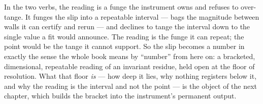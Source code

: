 In the two verbs, the reading is a funge the instrument owns and refuses to over-tange. It funges the slip into a repeatable
interval --- bags the magnitude between walls it can certify and rerun --- and declines to tange the interval down to the
single value a fit would announce. The reading is the funge it can repeat; the point would be the tange it cannot support. So
the slip becomes a number in exactly the sense the whole book means by ``number'' from here on: a bracketed, dimensional,
repeatable reading of an invariant residue, held open at the floor of resolution. What that floor \emph{is} --- how deep it
lies, why nothing registers below it, and why the reading is the interval and not the point --- is the object of the next
chapter, which builds the bracket into the instrument's permanent output.
